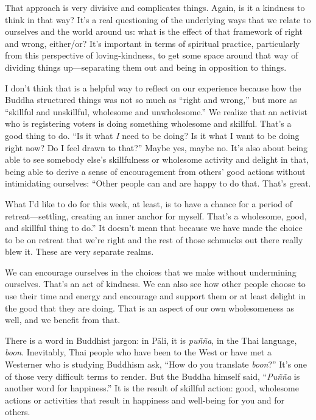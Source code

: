 That approach is very divisive and complicates things. Again, is it a
kindness to think in that way? It’s a real questioning of the underlying
ways that we relate to ourselves and the world around us: what is the
effect of that framework of right and wrong, either/or? It’s important
in terms of spiritual practice, particularly from this perspective of
loving-kindness, to get some space around that way of dividing things
up—separating them out and being in opposition to things.

I don’t think that is a helpful way to reflect on our experience because
how the Buddha structured things was not so much as “right and wrong,”
but more as “skillful and unskillful, wholesome and unwholesome.” We
realize that an activist who is registering voters is doing something
wholesome and skillful. That’s a good thing to do. “Is it what \emph{I}
need to be doing? Is it what I want to be doing right now? Do I feel
drawn to that?” Maybe yes, maybe no. It’s also about being able to see
somebody else’s skillfulness or wholesome activity and delight in that,
being able to derive a sense of encouragement from others’ good actions
without intimidating ourselves: “Other people can and are happy to do
that. That’s great.

What I’d like to do for this week, at least, is to have a chance for a
period of retreat—settling, creating an inner anchor for myself. That’s
a wholesome, good, and skillful thing to do.” It doesn’t mean that
because we have made the choice to be on retreat that we’re right and
the rest of those schmucks out there really blew it. These are very
separate realms.

We can encourage ourselves in the choices that we make without
undermining ourselves. That’s an act of kindness. We can also see how
other people choose to use their time and energy and encourage and
support them or at least delight in the good that they are doing. That
is an aspect of our own wholesomeness as well, and we benefit from that.

There is a word in Buddhist jargon: in Pāli, it is \emph{puñña}, in the
Thai language, \emph{boon}. Inevitably, Thai people who have been to the
West or have met a Westerner who is studying Buddhism ask, “How do you
translate \emph{boon}?” It’s one of those very difficult terms to
render. But the Buddha himself said, “\emph{Puñña} is another word for
happiness.” It is the result of skillful action: good, wholesome actions
or activities that result in happiness and well-being for you and for
others.

